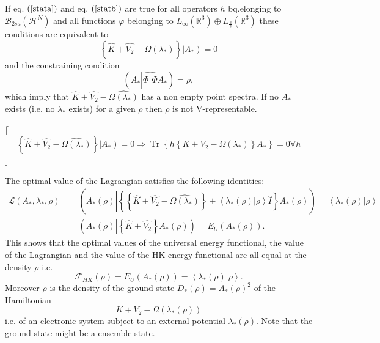 \documentclass[aps,preprint]{revtex4}%
\begin{document}
If eq. $\left(  \ref{stata}\right)  $ and eq. $\left(  \ref{statb}\right)  $
are true for all operators $h$ bq.elonging to $\mathcal{B}_{2sa}\left(
\mathcal{H}^{N}\right)  $ and all functions $\varphi$ belonging to $L_{\infty
}\left(  \mathbb{R}^{3}\right)  \oplus L_{\frac{3}{2}}\left(  \mathbb{R}%
^{3}\right)  $ these conditions are equivalent to
\begin{equation}
\left\{  \widehat{K}+\widehat{V_{2}}-\widehat{\Omega\left(  \lambda_{\ast
}\right)  }\right\}  \left\vert A_{\ast}\right)  =0 \label{Stateig}%
\end{equation}
and the constraining condition
\begin{equation}
\left(  A_{\ast}\left\vert \widehat{\Phi^{\dagger}\Phi}\right.  A_{\ast
}\right)  =\rho,
\end{equation}
which imply that $\widehat{K}+\widehat{V_{2}}-\widehat{\Omega\left(
\lambda_{\ast}\right)  }$ has a non empty point spectra. If no $A_{\ast}$
exists (i.e. no $\lambda_{\ast}$ exists) for a given $\rho$ then $\rho$ is not V-representable.

$\lceil$%
\[
\left\{  \widehat{K}+\widehat{V_{2}}-\widehat{\Omega\left(  \lambda_{\ast
}\right)  }\right\}  \left\vert A_{\ast}\right)  =0\Rightarrow
\operatorname{Tr}\left\{  h\left\{  K+V_{2}-\Omega\left(  \lambda_{\ast
}\right)  \right\}  A_{\ast}\right\}  =0\forall h
\]
$\rfloor$

The optimal value of the Lagrangian satisfies the following identities:
\begin{align}
\mathcal{L}\left(  A_{\ast},\lambda_{\ast},\rho\right)   &  =\left(  A_{\ast
}\left(  \rho\right)  \left\vert \left\{  \left\{  \widehat{K}+\widehat{V_{2}%
}-\widehat{\Omega\left(  \lambda_{\ast}\right)  }\right\}  +\left\langle
\left.  \lambda_{\ast}\left(  \rho\right)  \right\vert \rho\right\rangle
\hat{I}\right\}  \right.  A_{\ast}\left(  \rho\right)  \right)  =\left\langle
\left.  \lambda_{\ast}\left(  \rho\right)  \right\vert \rho\right\rangle
\nonumber\\
&  =\left(  A_{\ast}\left(  \rho\right)  \left\vert \left\{  \widehat{K}%
+\widehat{V_{2}}\right\}  \right.  A_{\ast}\left(  \rho\right)  \right)
=E_{U}\left(  A_{\ast}\left(  \rho\right)  \right)  .
\end{align}
This shows that the optimal values of the universal energy functional, the
value of the Lagrangian and the value of the HK energy functional are all
equal at the density $\rho$ i.e.
\begin{equation}
\mathcal{F}_{HK}\left(  \rho\right)  =E_{U}\left(  A_{\ast}\left(
\rho\right)  \right)  =\left\langle \left.  \lambda_{\ast}\left(  \rho\right)
\right\vert \rho\right\rangle .
\end{equation}
Moreover $\rho$ is the density of the ground state $D_{\ast}\left(
\rho\right)  =A_{\ast}\left(  \rho\right)  ^{2}$ of the Hamiltonian
\begin{equation}
K+V_{2}-\Omega\left(  \lambda_{\ast}\left(  \rho\right)  \right)
\end{equation}
i.e. of an electronic system subject to an external potential $\lambda_{\ast
}\left(  \rho\right)  $. Note that the ground state might be a ensemble state.
\end{document}
